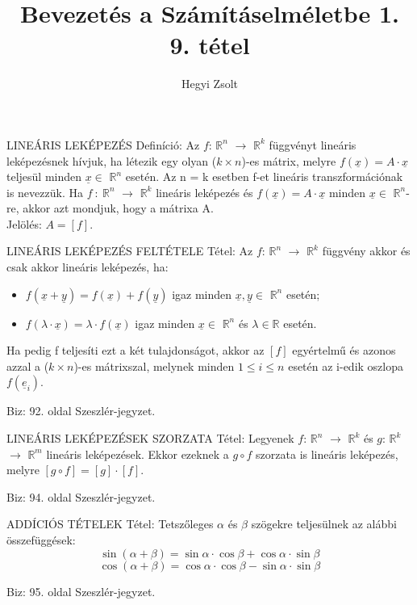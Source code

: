 \documentclass[]{article}
\title{Bevezetés a Számításelméletbe 1.\\{\large 9. tétel}}
\author{Hegyi Zsolt}
\newcommand{\R}{\mathbb{R}}
\newcommand{\Rn}[1]{$\mathbb{R}^{#1}$}
\newcommand{\Und}[1]{\underline{#1}}
\begin{document}
\maketitle{}
\begin{shaded}
LINEÁRIS LEKÉPEZÉS Definíció: Az $f$: \Rn{n} $\rightarrow$ \Rn{k} függvényt lineáris leképezésnek hívjuk, ha létezik egy olyan ($k \times n$)-es mátrix, melyre $f(\Und{x}) = A \cdot \Und{x}$ teljesül minden $\Und{x} \in$ \Rn{n} esetén. Az n = k esetben f-et lineáris transzformációnak is nevezzük. Ha $f\::\:$\Rn{n} $\rightarrow$ \Rn{k} lineáris leképezés és $f(\Und{x}) = A \cdot \Und{x}$ minden $\Und{x} \in$ \Rn{n}-re, akkor azt mondjuk, hogy a mátrixa A.\\
Jelölés: $A = [f]$.
\end{shaded}
\begin{framed}
LINEÁRIS LEKÉPEZÉS FELTÉTELE Tétel: Az $f$: \Rn{n} $\rightarrow$ \Rn{k} függvény akkor és csak akkor lineáris leképezés, ha:
\begin{itemize}
\item $f(\Und{x} + \Und{y}) = f(\Und{x}) + f(\Und{y})$ igaz minden $\Und{x},\Und{y} \in$ \Rn{n} esetén;
\item $f(\lambda \cdot \Und{x}) = \lambda \cdot f(\Und{x})$ igaz minden $\Und{x} \in$ \Rn{n} és $\lambda \in \R$ esetén.
\end{itemize}
Ha pedig f teljesíti ezt a két tulajdonságot, akkor az $[f]$ egyértelmű és azonos azzal a ($k \times n$)-es mátrixszal, melynek minden $1 \leq i \leq n$ esetén az i-edik oszlopa $f(\Und{e}_i)$.
\end{framed}
\begin{leftbar}
Biz: 92. oldal Szeszlér-jegyzet.
\end{leftbar}
\begin{framed}
LINEÁRIS LEKÉPEZÉSEK SZORZATA Tétel: Legyenek $f$: \Rn{n} $\rightarrow$ \Rn{k} és $g$: \Rn{k} $\rightarrow$ \Rn{m} lineáris leképezések. Ekkor ezeknek a $g \circ f$ szorzata is lineáris leképezés, melyre $[g \circ f] = [g] \cdot [f]$.
\end{framed}
\begin{leftbar}
Biz: 94. oldal Szeszlér-jegyzet.
\end{leftbar}
\begin{framed}
ADDÍCIÓS TÉTELEK Tétel: Tetszőleges $\alpha$ és $\beta$ szögekre teljesülnek az alábbi összefüggések:
$$\sin(\alpha + \beta) = \sin\alpha\cdot\cos\beta + \cos\alpha\cdot\sin\beta$$
$$\cos(\alpha + \beta) = \cos\alpha\cdot\cos\beta - \sin\alpha\cdot\sin\beta$$
\end{framed}
\begin{leftbar}
Biz: 95. oldal Szeszlér-jegyzet.
\end{leftbar}
\end{document}
